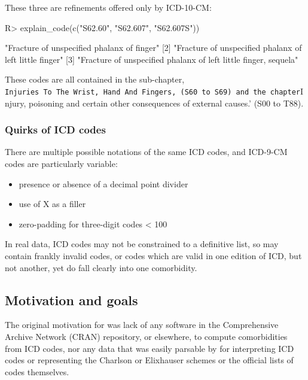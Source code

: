 \documentclass[article]{jss}
\providecommand{\tightlist}{%
  \setlength{\itemsep}{0pt}\setlength{\parskip}{0pt}}
\begin{document}
These three are refinements offered only by ICD-10-CM:

\begin{CodeChunk}

\begin{CodeInput}
R> explain_code(c("S62.60", "S62.607", "S62.607S"))
\end{CodeInput}

\begin{CodeOutput}
[1] "Fracture of unspecified phalanx of finger"                     
[2] "Fracture of unspecified phalanx of left little finger"         
[3] "Fracture of unspecified phalanx of left little finger, sequela"
\end{CodeOutput}
\end{CodeChunk}

These codes are all contained in the sub-chapter,
\texttt{Injuries\ To\ The\ Wrist,\ Hand\ And\ Fingers,\textquotesingle{}\ (S60\ to\ S69)\ and\ the\ chapter}Injury,
poisoning and certain other consequences of external causes.' (S00 to
T88).

\subsubsection{Quirks of ICD codes}\label{quirks-of-icd-codes}

There are multiple possible notations of the same ICD codes, and
ICD-9-CM codes are particularly variable:

\begin{itemize}
\tightlist
\item
  presence or absence of a decimal point divider
\item
  use of X as a filler
\item
  zero-padding for three-digit codes \textless{} 100
\end{itemize}

In real data, ICD codes may not be constrained to a definitive list, so
may contain frankly invalid codes, or codes which are valid in one
edition of ICD, but not another, yet do fall clearly into one
comorbidity.

\subsection{Motivation and goals}\label{motivation-and-goals}

The original motivation for  was lack of any 
software in the Comprehensive  Archive Network (CRAN)
repository, or elsewhere, to compute comorbidities from ICD codes, nor
any data that was easily parsable by  for interpreting ICD
codes or representing the Charlson or Elixhauser schemes or the official
lists of codes themselves.
\end{document}
